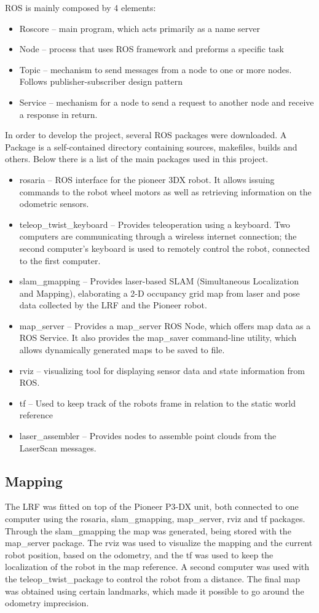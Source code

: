 ROS is mainly composed by 4 elements:
\begin{itemize}
\item Roscore -- main program, which acts primarily as a name server
\item Node -- process that uses ROS framework and preforms a specific task
\item Topic -- mechanism to send messages from a node to one or more nodes. Follows publisher-subscriber design pattern
\item Service -- mechanism for a node to send a request to another node and receive a response in return.
\end{itemize}
In order to develop the project, several ROS packages were downloaded. A Package is a self-contained directory containing sources, makefiles, builds and others. Below there is a list of the main packages used in this project.
\begin{itemize}
\item rosaria -- ROS interface for the pioneer 3DX robot. It allows issuing commands to the robot wheel motors as well as retrieving information on the odometric sensors.
\item teleop\_twist\_keyboard -- Provides teleoperation using a keyboard. Two computers are communicating through a wireless internet connection; the second computer’s keyboard is used to remotely control the robot, connected to the first computer. 
\item slam\_gmapping -- Provides laser-based SLAM (Simultaneous Localization and Mapping), elaborating a 2-D occupancy grid map from laser and pose data collected by the LRF and the Pioneer robot.
\item map\_server -- Provides a map\_server ROS Node, which offers map data as a ROS Service. It also provides the map\_saver command-line utility, which allows dynamically generated maps to be saved to file.
\item rviz -- visualizing tool for displaying sensor data and state information from ROS.
\item tf -- Used to keep track of the robots frame in relation to the static world reference
\item laser\_assembler -- Provides nodes to assemble point clouds from the LaserScan messages.
\end{itemize}


\subsection{Mapping}
\label{subsec:mapping}
The LRF was fitted on top of the Pioneer P3-DX unit, both connected to one computer using the rosaria, slam\_gmapping, map\_server, rviz and tf packages. Through the slam\_gmapping the map was generated, being stored with the map\_server package. The rviz was used to visualize the mapping and the current robot position, based on the odometry, and the tf was used to keep the localization of the robot in the map reference. A second computer was used with the teleop\_twist\_package to control the robot from a distance. The final map was obtained using certain landmarks, which made it possible to go around the odometry imprecision.

